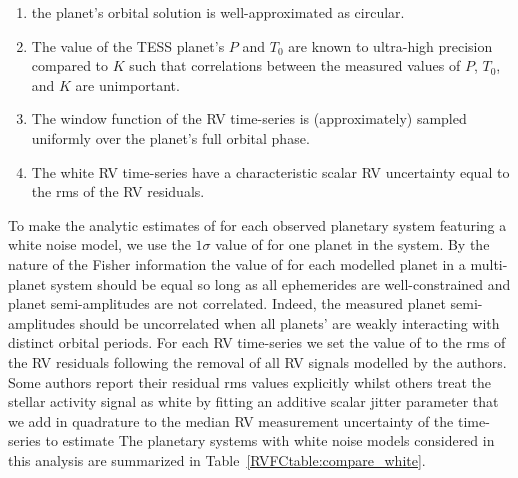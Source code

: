 \begin{enumerate}
\item the planet's orbital solution is well-approximated as circular.
\item The value of the TESS planet's $P$ and $T_0$ are known to ultra-high precision compared to $K$ such
  that correlations between the measured values of $P$, $T_0$, and $K$ are unimportant.
\item The window function of the RV time-series is (approximately) sampled uniformly over the planet's full
  orbital phase.
\item The white RV time-series have a characteristic scalar RV uncertainty equal to the rms of the RV residuals.
\end{enumerate}

\noindent To make the analytic estimates of \nrv{} for each observed planetary system featuring a white
noise model, we use the $1\sigma$ value of \sigK{} for one planet in the
system. By the nature of the Fisher information the value of \sigK{} for each modelled planet in a
multi-planet system should be equal so long as all ephemerides are well-constrained and
planet semi-amplitudes are not correlated. Indeed, the measured planet
semi-amplitudes should be uncorrelated when all planets' are weakly interacting with distinct orbital
periods. For each RV time-series we set the value of \sigeff{} to the
rms of the RV residuals following the removal of all RV signals modelled by the authors. Some authors
report their residual rms values explicitly whilst others treat the stellar activity signal as
white by fitting an additive scalar jitter parameter that we
add in quadrature to the median RV measurement uncertainty of the time-series to estimate 
The planetary systems with white noise models
considered in this analysis are summarized in Table~\ref{RVFCtable:compare_white}.



